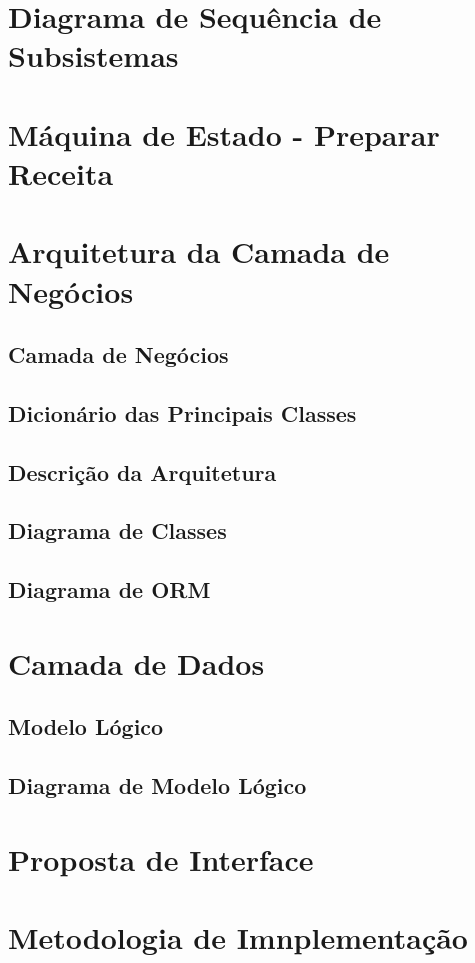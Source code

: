 \documentclass[a4paper]{report}
\begin{document}
\chapter{Diagrama de Sequência de Subsistemas}

\chapter{Máquina de Estado - Preparar Receita}

\chapter{Arquitetura da Camada de Negócios}
    \section{Camada de Negócios}
    \section{Dicionário das Principais Classes}
    \section{Descrição da Arquitetura}
    \section{Diagrama de Classes}
    \section{Diagrama de ORM}

\chapter{Camada de Dados}
    \section{Modelo Lógico}
    \section{Diagrama de Modelo Lógico}

\chapter{Proposta de Interface}

\chapter{Metodologia de Imnplementação}
\end{document}

